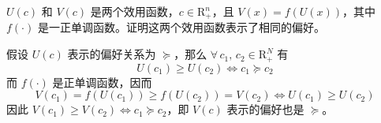 
\begin{problem}
 $U(c)$ 和 $V(c)$ 是两个效用函数，$c\in\mathrm{R}_{+}^{n}$，且 $V(x)=f(U(x))$，其中 $f(\cdot)$ 是一正单调函数。证明这两个效用函数表示了相同的偏好。
\end{problem}
\begin{solution}
假设 $U(c)$ 表示的偏好关系为 $\succeq$，那么 $\forall\, c_{1},\,c_{2}\in\mathrm{R}_{+}^{N}$ 有
\[
    U(c_{1})\ge U(c_{2})\Leftrightarrow c_{1}\succeq c_{2}
\]
而 $f(\cdot)$ 是正单调函数，因而
\[
    V(c_{1})=f(U(c_{1}))\ge f(U(c_{2}))=V(c_{2})\Leftrightarrow U(c_{1})\ge U(c_{2})
\]
因此 $V(c_{1})\ge V(c_{2})\Leftrightarrow c_{1}\succeq c_{2}$，即 $V(c)$ 表示的偏好也是 $\succeq$。
\end{solution}

